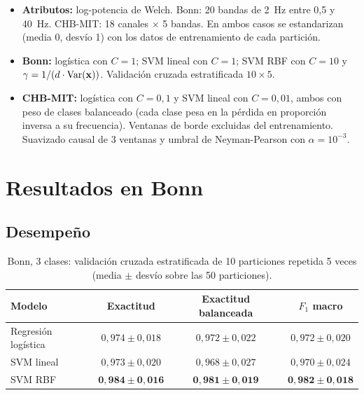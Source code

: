 \begin{itemize}
  \item \textbf{Atributos:} log-potencia de Welch. Bonn: 20 bandas de 2~Hz entre 0,5 y 40~Hz. CHB-MIT: 18 canales
        $\times$ 5 bandas. En ambos casos se estandarizan (media 0, desvío 1) con los datos de entrenamiento de cada
        partición.
  \item \textbf{Bonn:} logística con $C = 1$; SVM lineal con $C = 1$; SVM RBF con $C = 10$ y
        $\gamma = 1/(d\cdot\operatorname{Var}(\mathbf{x}))$. Validación cruzada estratificada $10\times5$.
  \item \textbf{CHB-MIT:} logística con $C = 0{,}1$ y SVM lineal con $C = 0{,}01$, ambos con peso de clases balanceado
        (cada clase pesa en la pérdida en proporción inversa a su frecuencia). Ventanas de borde excluidas del
        entrenamiento. Suavizado causal de 3 ventanas y umbral de Neyman-Pearson con $\alpha = 10^{-3}$.
\end{itemize}

\section{Resultados en Bonn}
\label{sec:bonn_resultados}

\subsection{Desempeño}

\begin{table}[ht]
\centering
\caption{Bonn, 3 clases: validación cruzada estratificada de 10 particiones repetida 5 veces (media $\pm$ desvío sobre
las 50 particiones).}
\label{tab:bonn_cv}
\begin{tabular}{lccc}
\toprule
Modelo & Exactitud & Exactitud balanceada & $F_1$ macro \\
\midrule
Regresión logística & $0{,}974 \pm 0{,}018$ & $0{,}972 \pm 0{,}022$ & $0{,}972 \pm 0{,}020$ \\
SVM lineal          & $0{,}973 \pm 0{,}020$ & $0{,}968 \pm 0{,}027$ & $0{,}970 \pm 0{,}024$ \\
SVM RBF             & $\mathbf{0{,}984 \pm 0{,}016}$ & $\mathbf{0{,}981 \pm 0{,}019}$ & $\mathbf{0{,}982 \pm 0{,}018}$ \\
\bottomrule
\end{tabular}
\end{table}

